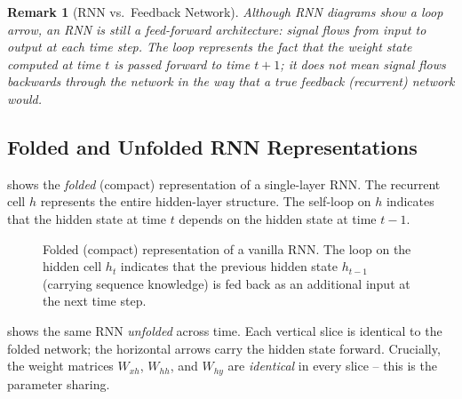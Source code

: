 \documentclass[12pt,a4paper]{article}
\newtheorem{remark}{Remark}[section]
\newcommand{\Whh}{W_{hh}}
\newcommand{\Wxh}{W_{xh}}
\newcommand{\Why}{W_{hy}}
\begin{document}
\begin{remark}[RNN vs.\ Feedback Network]
\label{rem:feedforward}
Although RNN diagrams show a loop arrow, an RNN is still a \emph{feed-forward}
architecture: signal flows from input to output at each time step.  The loop
represents the fact that the weight state computed at time $t$ is \emph{passed
forward} to time $t+1$; it does not mean signal flows backwards through the
network in the way that a true feedback (recurrent) network would.
\end{remark}

\subsection{Folded and Unfolded RNN Representations}
\label{subsec:folded_unfolded}

 shows the \emph{folded} (compact) representation of a
single-layer RNN.  The recurrent cell $h$ represents the entire hidden-layer
structure.  The self-loop on $h$ indicates that the hidden state at time $t$
depends on the hidden state at time $t-1$.

\begin{figure}[ht]
\centering
{}
\caption{Folded (compact) representation of a vanilla RNN.  The loop on the
hidden cell $h_t$ indicates that the previous hidden state $h_{t-1}$ (carrying
sequence knowledge) is fed back as an additional input at the next time step.}
\label{fig:rnn_compact}
\end{figure}

 shows the same RNN \emph{unfolded} across time.  Each
vertical slice is identical to the folded network; the horizontal arrows carry
the hidden state forward.  Crucially, the weight matrices $\Wxh$, $\Whh$, and
$\Why$ are \emph{identical} in every slice -- this is the parameter sharing.
\end{document}

